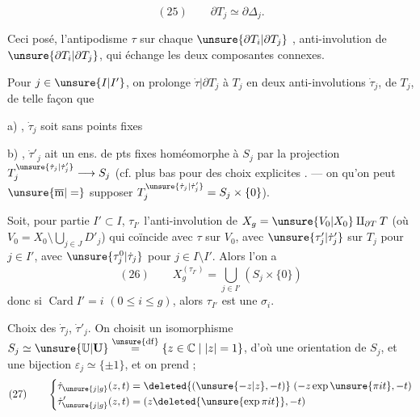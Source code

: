 
\[
(25)\qquad \partial T_j\simeq\partial\Delta_j.
\]



Ceci posé, l'antipodisme $\tau$  sur chaque $\unsure{\partial T_i|\partial T_j}$ , anti-involution     de $\unsure{\partial T_i|\partial T_j}$, qui échange les deux composantes connexes.

Pour  $j\in\unsure{I|I'}$, on prolonge $\dot\tau|\partial T_j$ à $T_j$ en deux anti-involutions $\dot\tau_j$,  de $T_j$,   de telle façon que


a) , $\dot\tau_j$ soit sans points fixes

b) , $\dot\tau'_j$ ait un ens. de pts fixes homéomorphe à $S_j$ par la projection $T_j^{\unsure{\dot\tau_j|\dot\tau'_j}}\longrightarrow S_j$ (cf. plus bas \unsure{\}} pour des choix   explicites \unsure{\}}. --- on  qu'on peut $\unsure{\overline{\mathrm m}|=}$ supposer $T_j^{\unsure{\dot\tau_j|\dot\tau'_j}}=S_j\times\{0\}$).

Soit, pour  partie $I'\subset I$, $\tau_{I'}$ l'anti-involution de $X_g=\unsure{V_0|X_0}\amalg_{\partial T}T$ (où $V_0=X_0\setminus\bigcup_{j\in J}D'_j$) qui coïncide avec $\tau$ sur $V_0$, avec $\unsure{\tau'_j|\dot\tau'_j}$ sur $T_j$ pour $j\in I'$, avec $\unsure{\tau_j^0|\dot\tau_j}$ pour $j\in I\setminus I'$. Alors l'on a
\[
(26)\qquad X_g^{(\tau_{I'})}=\bigcup_{j\in I'}(S_j\times\{0\})
\]
donc si $\operatorname{Card}I'=i$ $(0\leq i\leq g)$, alors $\tau_{I'}$ est une $\sigma_i$.

Choix des $\dot\tau_j$, $\dot\tau'_j$. On choisit un isomorphisme $S_j\simeq\unsure{\mathbb U|\mathbf U}\overset{\unsure{\mathrm{df}}}{=}\{z\in\mathbb C\mid |z|=1\}$, d'où une orientation de $S_j$, et une bijection $\varepsilon_j\simeq\{\pm1\}$,  et on prend ;
\[
(27)\qquad
\left\{\begin{aligned}
\dot\tau_{\unsure{j|g}}(z,t)&=\deleted{(\unsure{-z|z},-t)}\;(-z\exp\unsure{\pi it},-t)\\
\dot\tau'_{\unsure{j|g}}(z,t)&=(z\deleted{\unsure{\exp\pi it}},-t)
\end{aligned}\right.
\]

